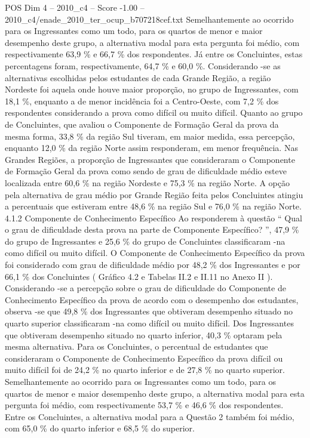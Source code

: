 \begin{textsample}{POS Dim 4 – 2010\_c4 – Score -1.00 – 2010\_c4/enade\_2010\_ter\_ocup\_b707218cef.txt}
Semelhantemente ao ocorrido para os Ingressantes como um todo, para os quartos de menor e maior desempenho deste grupo, a alternativa modal para esta pergunta foi médio, com respectivamente 63,9 \% e 66,7 \% dos respondentes.
Já entre os Concluintes, estas percentagens foram, respectivamente, 64,7 \% e 60,0 \%.
Considerando -se as alternativas escolhidas pelos estudantes de cada Grande Região, a região Nordeste foi aquela onde houve maior proporção, no grupo de Ingressantes, com 18,1 \%, enquanto a de menor incidência foi a Centro-Oeste, com 7,2 \% dos respondentes considerando a prova como difícil ou muito difícil.
Quanto ao grupo de Concluintes, que avaliou o Componente de Formação Geral da prova da mesma forma, 33,8 \% da região Sul tiveram, em maior medida, essa percepção, enquanto 12,0 \% da região Norte assim responderam, em menor frequência.
Nas Grandes Regiões, a proporção de Ingressantes que consideraram o Componente de Formação Geral da prova como sendo de grau de dificuldade médio esteve localizada entre 60,6 \% na região Nordeste e 75,3 \% na região Norte.
A opção pela alternativa de grau médio por Grande Região feita pelos Concluintes atingiu a percentuais que estiveram entre 48,6 \% na região Sul e 76,0 \% na região Norte. 4.1.2 Componente de Conhecimento Específico Ao responderem à questão “ Qual o grau de dificuldade desta prova na parte de Componente Específico? ”, 47,9 \% do grupo de Ingressantes e 25,6 \% do grupo de Concluintes classificaram -na como difícil ou muito difícil.
O Componente de Conhecimento Específico da prova foi considerado com grau de dificuldade médio por 48,2 \% dos Ingressantes e por 66,1 \% dos Concluintes ( Gráfico 4.2 e Tabelas II.2 e II.11 no Anexo II ).
Considerando -se a percepção sobre o grau de dificuldade do Componente de Conhecimento Específico da prova de acordo com o desempenho dos estudantes, observa -se que 49,8 \% dos Ingressantes que obtiveram desempenho situado no quarto superior classificaram -na como difícil ou muito difícil.
Dos Ingressantes que obtiveram desempenho situado no quarto inferior, 40,3 \% optaram pela mesma alternativa.
Para os Concluintes, o percentual de estudantes que consideraram o Componente de Conhecimento Específico da prova difícil ou muito difícil foi de 24,2 \% no quarto inferior e de 27,8 \% no quarto superior.
Semelhantemente ao ocorrido para os Ingressantes como um todo, para os quartos de menor e maior desempenho deste grupo, a alternativa modal para esta pergunta foi médio, com respectivamente 53,7 \% e 46,6 \% dos respondentes.
Entre os Concluintes, a alternativa modal para a Questão 2 também foi médio, com 65,0 \% do quarto inferior e 68,5 \% do superior.

\end{textsample}
